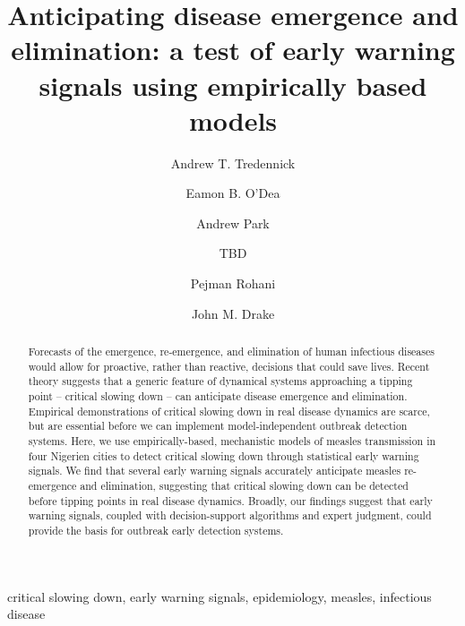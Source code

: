 \documentclass[3p]{elsarticle} %
\begin{document}
\begin{frontmatter}

  \title{Anticipating disease emergence and elimination: a test of early warning
signals using empirically based models}
    \author[UGA,CEID]{Andrew T. Tredennick}
    \author[UGA,CEID]{Eamon B. O'Dea}
  
  
    \author[UGA,CEID]{Andrew Park}
  
  
    \author[other]{TBD}
  
  
    \author[UGA,CEID,ID]{Pejman Rohani}
  
  
    \author[UGA,CEID]{John M. Drake}
  
      \address[UGA]{Odum School of Ecology, University of Georgia, Athens, GA 30602, USA}
    \address[CEID]{Center for the Ecology of Infectious Diseases, University of Georgia,
Athens, GA 30602, USA}
    \address[other]{A University of Somewhere}
    \address[ID]{Department of Infectious Diseases, University of Georgia, Athens, GA
30602, USA}
  
  \begin{abstract}
  Forecasts of the emergence, re-emergence, and elimination of human
  infectious diseases would allow for proactive, rather than reactive,
  decisions that could save lives. Recent theory suggests that a generic
  feature of dynamical systems approaching a tipping point -- critical
  slowing down -- can anticipate disease emergence and elimination.
  Empirical demonstrations of critical slowing down in real disease
  dynamics are scarce, but are essential before we can implement
  model-independent outbreak detection systems. Here, we use
  empirically-based, mechanistic models of measles transmission in four
  Nigerien cities to detect critical slowing down through statistical
  early warning signals. We find that several early warning signals
  accurately anticipate measles re-emergence and elimination, suggesting
  that critical slowing down can be detected before tipping points in real
  disease dynamics. Broadly, our findings suggest that early warning
  signals, coupled with decision-support algorithms and expert judgment,
  could provide the basis for outbreak early detection systems.
  \end{abstract}
   \begin{keyword} critical slowing down, early warning signals, epidemiology, measles, infectious disease\end{keyword}
 \end{frontmatter}
\end{document}
